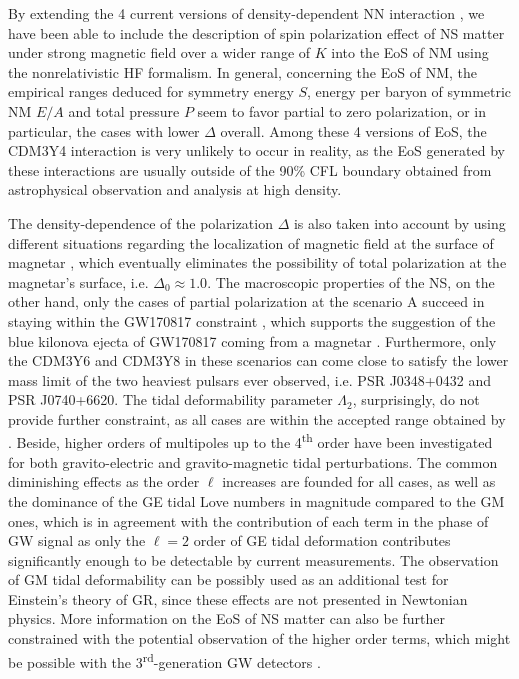 By extending the 4 current versions of density-dependent \gls{NN} interaction \citep{tan2021equation}, we have been able to include the description of spin polarization effect of \gls{NS} matter under strong magnetic field over a wider range of $K$ into the \gls{EoS} of \gls{NM} using the nonrelativistic \gls{HF} formalism. In general, concerning the \gls{EoS} of \gls{NM}, the empirical ranges deduced for symmetry energy $S$, energy per baryon of symmetric \gls{NM} $E/A$ and total pressure $P$ seem to favor partial to zero polarization, or in particular, the cases with lower $\Delta$ overall. Among these 4 versions of \gls{EoS}, the CDM3Y4 interaction is very unlikely to occur in reality, as the \gls{EoS} generated by these interactions are usually outside of the 90\% \gls{CFL} boundary obtained from astrophysical observation and analysis at high density.

The density-dependence of the polarization $\Delta$ is also taken into account by using different situations regarding the localization of magnetic field at the surface of magnetar \citep{tan2020spin}, which eventually eliminates the possibility of total polarization at the magnetar's surface, i.e. $\Delta_0\approx 1.0$. The macroscopic properties of the \gls{NS}, on the other hand, only the cases of partial polarization at the scenario A succeed in staying within the GW170817 constraint \citep{abbott2018gw170817}, which supports the suggestion of the blue kilonova ejecta of GW170817 coming from a magnetar \citep{metzger2018magnetar,tan2020spin}. Furthermore, only the CDM3Y6 and CDM3Y8 in these scenarios can come close to satisfy the lower mass limit of the two heaviest pulsars ever observed, i.e. \gls{PSR} J0348+0432 and \gls{PSR} J0740+6620. The tidal deformability parameter $\Lambda_2$, surprisingly, do not provide further constraint, as all cases are within the accepted range obtained by \cite{abbott2018gw170817}. Beside, higher orders of multipoles up to the 4\textsuperscript{th} order have been investigated for both gravito-electric and gravito-magnetic tidal perturbations. The common diminishing effects as the order $\ell$ increases are founded for all cases, as well as the dominance of the \gls{GE} tidal Love numbers in magnitude compared to the \gls{GM} ones, which is in agreement with the contribution of each term in the phase of \gls{GW} signal \citep{abdelsalhin2018post} as only the $\ell=2$ order of GE tidal deformation contributes significantly enough to be detectable by current measurements. The observation of \gls{GM} tidal deformability can be possibly used as an additional test for Einstein's theory of \gls{GR}, since these effects are not presented in Newtonian physics. More information on the \gls{EoS} of \gls{NS} matter can also be further constrained with the potential observation of the higher order terms, which might be possible with the 3\textsuperscript{rd}-generation \gls{GW} detectors \citep{maggiore2020science}.

